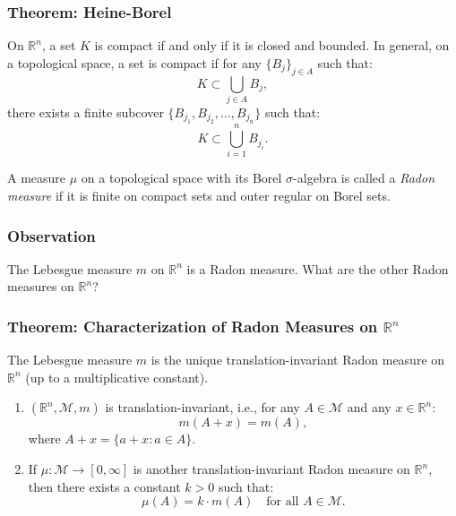 \documentclass[11pt]{article}
\begin{document}
\begin{center}
\end{center}

\subsubsection{Theorem: Heine-Borel}
On \(\mathbb{R}^n\), a set \(K\) is compact if and only if it is closed and bounded. In general, on a topological space, a set is compact if for any \(\{B_j\}_{j \in A}\) such that:
\[K \subset \bigcup_{j \in A} B_j,\]
there exists a finite subcover \(\{B_{j_1}, B_{j_2}, \ldots, B_{j_n}\}\) such that:
\[K \subset \bigcup_{i=1}^{n} B_{j_i}.\]

A measure \(\mu\) on a topological space with its Borel \(\sigma\)-algebra is called a \textit{Radon measure} if it is finite on compact sets and outer regular on Borel sets.

\subsubsection*{Observation}
The Lebesgue measure \(m\) on \(\mathbb{R}^n\) is a Radon measure. What are the other Radon measures on \(\mathbb{R}^n\)?

\subsubsection{Theorem: Characterization of Radon Measures on \(\mathbb{R}^n\)}
The Lebesgue measure \(m\) is the unique translation-invariant Radon measure on \(\mathbb{R}^n\) (up to a multiplicative constant).  
\begin{enumerate}
    \item \((\mathbb{R}^n, \mathcal{M}, m)\) is translation-invariant, i.e., for any \(A \in \mathcal{M}\) and any \(x \in \mathbb{R}^n\):
    \[m(A + x) = m(A),\]
    where \(A + x = \{a + x : a \in A\}\).
    \item If \(\mu : \mathcal{M} \to [0, \infty]\) is another translation-invariant Radon measure on \(\mathbb{R}^n\), then there exists a constant \(k > 0\) such that:
    \[\mu(A) = k \cdot m(A) \quad \text{for all } A \in \mathcal{M}.\]
\end{enumerate}
\end{document}
